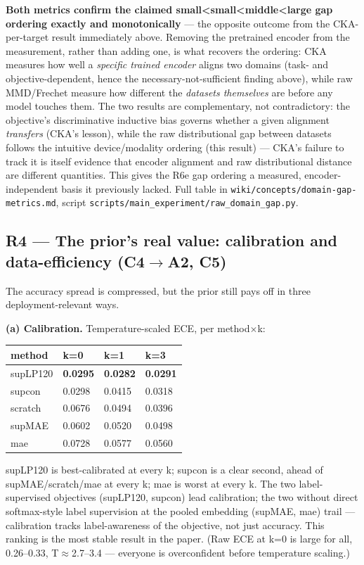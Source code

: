 \textbf{Both metrics confirm the claimed small<small<middle<large gap ordering exactly and monotonically} --- the opposite outcome from the CKA-per-target result immediately above. Removing the pretrained encoder from the measurement, rather than adding one, is what recovers the ordering: CKA measures how well a \textit{specific trained encoder} aligns two domains (task- and objective-dependent, hence the necessary-not-sufficient finding above), while raw MMD/Frechet measure how different the \textit{datasets themselves} are before any model touches them. The two results are complementary, not contradictory: the objective's discriminative inductive bias governs whether a given alignment \textit{transfers} (CKA's lesson), while the raw distributional gap between datasets follows the intuitive device/modality ordering (this result) --- CKA's failure to track it is itself evidence that encoder alignment and raw distributional distance are different quantities. This gives the R6e gap ordering a measured, encoder-independent basis it previously lacked. Full table in \texttt{wiki/concepts/domain-gap-metrics.md}, script \texttt{scripts/main\_experiment/raw\_domain\_gap.py}.

\subsection{R4 --- The prior's real value: calibration and data-efficiency (C4$\rightarrow$A2, C5)}

The accuracy spread is compressed, but the prior still pays off in three deployment-relevant ways.

\textbf{(a) Calibration.} Temperature-scaled ECE, per method$\times$k:

\begin{center}
\small
\begin{tabular}{llll}
\toprule
method & k=0 & k=1 & k=3 \\
\midrule
supLP120 & \textbf{0.0295} & \textbf{0.0282} & \textbf{0.0291} \\
supcon & 0.0298 & 0.0415 & 0.0318 \\
scratch & 0.0676 & 0.0494 & 0.0396 \\
supMAE & 0.0602 & 0.0520 & 0.0498 \\
mae & 0.0728 & 0.0577 & 0.0560 \\
\bottomrule
\end{tabular}
\end{center}

supLP120 is best-calibrated at every k; supcon is a clear second, ahead of supMAE/scratch/mae at every k; mae is worst at every k. The two label-supervised objectives (supLP120, supcon) lead calibration; the two without direct softmax-style label supervision at the pooled embedding (supMAE, mae) trail --- calibration tracks label-awareness of the objective, not just accuracy. This ranking is the most stable result in the paper. (Raw ECE at k=0 is large for all, 0.26--0.33, T$\approx$2.7--3.4 --- everyone is overconfident before temperature scaling.)


